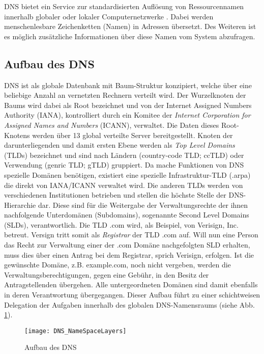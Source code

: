 DNS bietet ein Service zur standardisierten Auflösung von Ressourcennamen innerhalb globaler oder lokaler Computernetzwerke \cite{rfc1035}. Dabei werden menschenlesbare Zeichenketten (Namen) in Adressen übersetzt. Des Weiteren ist es möglich zusätzliche Informationen über diese Namen vom System abzufragen.

\subsection{Aufbau des DNS}

DNS ist als globale Datenbank mit Baum-Struktur konzipiert, welche über eine beliebige Anzahl an vernetzten Rechnern verteilt wird. Der Wurzelknoten der Baums wird dabei als Root bezeichnet und von der Internet Assigned Numbers Authority (IANA), kontrolliert durch ein Komitee der \textit{Internet Corporation for Assigned Names and Numbers} (ICANN), verwaltet. Die Daten dieses Root-Knotens werden über 13 global verteilte Server bereitgestellt. Knoten der darunterliegenden und damit ersten Ebene werden als \textit{Top Level Domains} (TLDs) bezeichnet und sind nach Ländern (country-code TLD; ccTLD) oder Verwendung (genric TLD; gTLD) gruppiert. Da mache Funktionen von DNS spezielle Domänen benötigen, existiert eine spezielle Infrastruktur-TLD (.arpa) die direkt von IANA/ICANN verwaltet wird. Die anderen TLDs werden von verschiedenen Institutionen betrieben und stellen die höchste Stelle der DNS-Hierarchie dar. Diese sind für die Weitergabe der Verwaltungsrechte der ihnen nachfolgende Unterdomänen (Subdomains), sogenannte Second Level Domains (SLDs), verantwortlich. Die TLD .com wird, als Beispiel, von Verisign, Inc. betreut. Versign tritt somit als \textit{Registrar} der TLD .com auf. Will nun eine Person das Recht zur Verwaltung einer der .com Domäne nachgefolgten SLD erhalten, muss dies über einen Antrag bei dem Registrar, sprich Verisign, erfolgen. Ist die gewünschte Domäne, z.B. example.com, noch nicht vergeben, werden die Verwaltungsberechtigungen, gegen eine Gebühr, in den Besitz der Antragstellenden übergehen. Alle untergeordneten Domänen sind damit ebenfalls in deren Verantwortung übergegangen. Dieser Aufbau führt zu einer schichtweisen Delegation der Aufgaben innerhalb des globalen DNS-Namensraums (siehe Abb. \ref{img:dnsnamespace}). 

\begin{figure}[!hb]
    \centering
    \texttt{[image: DNS\_NameSpaceLayers]}
    \caption{Aufbau des DNS}
    \label{img:dnsnamespace}
\end{figure}

